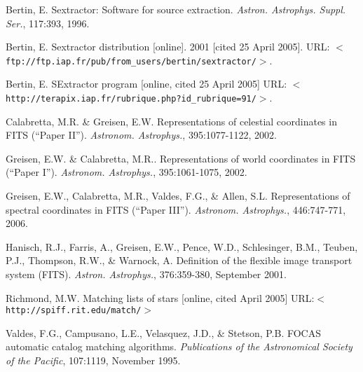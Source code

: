 \documentclass[twoside,11pt,nolof]{starlink}
\begin{document}
\begin{thebibliography}{}

 Bertin, E. Sextractor: Software for source
  extraction. \textit{Astron. Astrophys. Suppl. Ser.}, 117:393, 1996.

 Bertin, E. Sextractor distribution [online]. 2001
  [cited 25 April 2005]. URL:
  \texttt{$<$ftp://ftp.iap.fr/pub/from\_users/bertin/sextractor/$>$}.

 Bertin, E. SExtractor program [online, cited 25 April
  2005] URL:
  \texttt{$<$http://terapix.iap.fr/rubrique.php?id\_rubrique=91/$>$}.

 Calabretta, M.R. \& Greisen, E.W. Representations of
  celestial coordinates in FITS (``Paper II''). \textit{Astronom. Astrophys.},
  395:1077-1122, 2002.

 Greisen, E.W. \& Calabretta, M.R.. Representations of world
  coordinates in FITS (``Paper I''). \textit{Astronom. Astrophys.},
  395:1061-1075, 2002.

 Greisen, E.W., Calabretta, M.R., Valdes, F.G., \& Allen,
  S.L. Representations of spectral coordinates in FITS (``Paper III'').
  \textit{Astronom. Astrophys.}, 446:747-771, 2006.

 Hanisch, R.J., Farris, A., Greisen, E.W., Pence, W.D.,
  Schlesinger, B.M., Teuben, P.J., Thompson, R.W., \& Warnock, A. Definition
  of the flexible image transport system (FITS). \textit{Astron. Astrophys.},
  376:359-380, September 2001.

 Richmond, M.W. Matching lists of stars [online, cited
  April 2005] URL:\texttt{$<$http://spiff.rit.edu/match/$>$}

 Valdes, F.G., Campusano, L.E., Velasquez, J.D., \& Stetson,
  P.B. FOCAS automatic catalog matching algorithms. \textit{Publications of
    the Astronomical Society of the Pacific}, 107:1119, November 1995.

\end{thebibliography}
\end{document}
